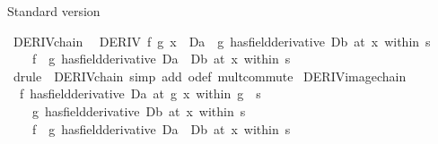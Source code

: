 \begin{isabellebody}
\endisatagproof
{\isafoldproof}%
%
\isadelimproof
%
\endisadelimproof
%
\begin{isamarkuptext}%
Standard version%
\end{isamarkuptext}\isamarkuptrue%
\isamarkupfalse%
\ DERIV{\isacharunderscore}{\kern0pt}chain{\isacharcolon}{\kern0pt}\isanewline
\ \ {\isachardoublequoteopen}DERIV\ f\ {\isacharparenleft}{\kern0pt}g\ x{\isacharparenright}{\kern0pt}\ {\isacharcolon}{\kern0pt}{\isachargreater}{\kern0pt}\ Da\ {\isasymLongrightarrow}\ {\isacharparenleft}{\kern0pt}g\ has{\isacharunderscore}{\kern0pt}field{\isacharunderscore}{\kern0pt}derivative\ Db{\isacharparenright}{\kern0pt}\ {\isacharparenleft}{\kern0pt}at\ x\ within\ s{\isacharparenright}{\kern0pt}\ {\isasymLongrightarrow}\isanewline
\ \ \ \ {\isacharparenleft}{\kern0pt}f\ {\isasymcirc}\ g\ has{\isacharunderscore}{\kern0pt}field{\isacharunderscore}{\kern0pt}derivative\ Da\ {\isacharasterisk}{\kern0pt}\ Db{\isacharparenright}{\kern0pt}\ {\isacharparenleft}{\kern0pt}at\ x\ within\ s{\isacharparenright}{\kern0pt}{\isachardoublequoteclose}\isanewline
%
\isadelimproof
\ \ %
\endisadelimproof
%
\isatagproof
{}\isamarkupfalse%
\ {\isacharparenleft}{\kern0pt}drule\ {\isacharparenleft}{\kern0pt}{}{\isacharparenright}{\kern0pt}\ DERIV{\isacharunderscore}{\kern0pt}chain{\isacharprime}{\kern0pt}{\isacharcomma}{\kern0pt}\ simp\ add{\isacharcolon}{\kern0pt}\ o{\isacharunderscore}{\kern0pt}def\ mult{\isachardot}{\kern0pt}commute{\isacharparenright}{\kern0pt}%
\endisatagproof
{\isafoldproof}%
%
\isadelimproof
\isanewline
%
\endisadelimproof
\isanewline
{}\isamarkupfalse%
\ DERIV{\isacharunderscore}{\kern0pt}image{\isacharunderscore}{\kern0pt}chain{\isacharcolon}{\kern0pt}\isanewline
\ \ {\isachardoublequoteopen}{\isacharparenleft}{\kern0pt}f\ has{\isacharunderscore}{\kern0pt}field{\isacharunderscore}{\kern0pt}derivative\ Da{\isacharparenright}{\kern0pt}\ {\isacharparenleft}{\kern0pt}at\ {\isacharparenleft}{\kern0pt}g\ x{\isacharparenright}{\kern0pt}\ within\ {\isacharparenleft}{\kern0pt}g\ {\isacharbackquote}{\kern0pt}\ s{\isacharparenright}{\kern0pt}{\isacharparenright}{\kern0pt}\ {\isasymLongrightarrow}\isanewline
\ \ \ \ {\isacharparenleft}{\kern0pt}g\ has{\isacharunderscore}{\kern0pt}field{\isacharunderscore}{\kern0pt}derivative\ Db{\isacharparenright}{\kern0pt}\ {\isacharparenleft}{\kern0pt}at\ x\ within\ s{\isacharparenright}{\kern0pt}\ {\isasymLongrightarrow}\isanewline
\ \ \ \ {\isacharparenleft}{\kern0pt}f\ {\isasymcirc}\ g\ has{\isacharunderscore}{\kern0pt}field{\isacharunderscore}{\kern0pt}derivative\ Da\ {\isacharasterisk}{\kern0pt}\ Db{\isacharparenright}{\kern0pt}\ {\isacharparenleft}{\kern0pt}at\ x\ within\ s{\isacharparenright}{\kern0pt}{\isachardoublequoteclose}\isanewline

\end{isabellebody}

